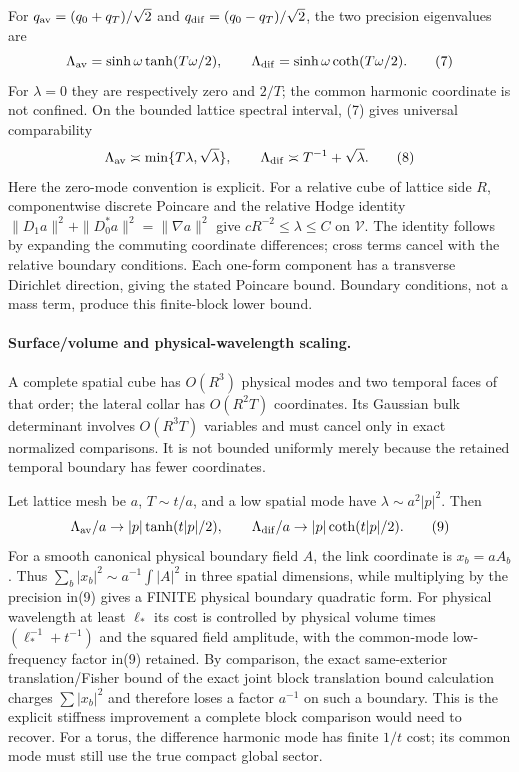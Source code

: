 \documentclass[11pt]{article}
\begin{document}
For $q_{\rm av}=(q_0+q_T)/\sqrt2$ and
$q_{\rm dif}=(q_0-q_T)/\sqrt2$, the two precision eigenvalues are
\[
 \Lambda_{\rm av}=\sinh\omega\tanh(T\omega/2),\qquad
 \Lambda_{\rm dif}=\sinh\omega\coth(T\omega/2).                          \tag{7}
\]
For $\lambda=0$ they are respectively zero and $2/T$; the common harmonic
coordinate is not confined. On the bounded lattice spectral interval, (7)
gives universal comparability
\[
 \Lambda_{\rm av}\asymp\min\{T\lambda,\sqrt\lambda\},\qquad
 \Lambda_{\rm dif}\asymp T^{-1}+\sqrt\lambda.                            \tag{8}
\]
Here the zero-mode convention is explicit. For a relative cube of lattice
side $R$, componentwise discrete Poincare and the relative Hodge identity
$\|D_1a\|^2+\|D_0^*a\|^2=\|\nabla a\|^2$ give
$cR^{-2}\le\lambda\le C$ on $\mathcal V$.
The identity follows by expanding the commuting coordinate differences; cross
terms cancel with the relative boundary conditions. Each one-form component
has a transverse Dirichlet direction, giving the stated Poincare bound.
Boundary conditions, not a mass term, produce this finite-block lower bound.

\paragraph{Surface/volume and physical-wavelength scaling.}
A complete spatial cube has $O(R^3)$ physical modes and two temporal faces of
that order; the lateral collar has $O(R^2T)$ coordinates. Its Gaussian bulk
determinant involves $O(R^3T)$ variables and must cancel only in exact
normalized comparisons. It is not bounded uniformly merely because the
retained temporal boundary has fewer coordinates.

Let lattice mesh be $a$, $T\sim t/a$, and a low spatial mode have
$\lambda\sim a^2|p|^2$. Then
\[
 \Lambda_{\rm av}/a\to |p|\tanh(t|p|/2),\qquad
 \Lambda_{\rm dif}/a\to |p|\coth(t|p|/2).                               \tag{9}
\]
For a smooth canonical physical boundary field $A$, the link coordinate is
$x_b=aA_b$. Thus $\sum_b|x_b|^2\sim a^{-1}\int|A|^2$ in three spatial
dimensions, while multiplying by the precision in(9) gives a FINITE physical
boundary quadratic form. For physical wavelength at least $\ell_*$ its cost
is controlled by physical volume times $(\ell_*^{-1}+t^{-1})$ and the squared
field amplitude, with the common-mode low-frequency factor in(9) retained.
By comparison, the exact same-exterior translation/Fisher bound of the exact joint block translation bound calculation
charges $\sum|x_b|^2$ and therefore loses a factor $a^{-1}$ on such a boundary.
This is the explicit stiffness improvement a complete block comparison would
need to recover. For a torus, the difference harmonic mode has finite
$1/t$ cost; its common mode must still use the true compact global sector.
\end{document}

